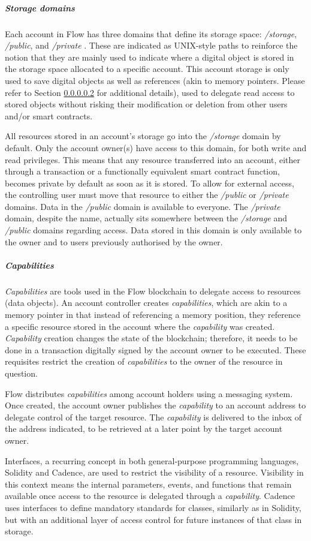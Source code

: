 \documentclass[./4_GeneralApproach.tex]{subfiles}
\begin{document}
    \subparagraph{Storage domains}
    \label{storage_domains}
    Each account in Flow has three domains that define its storage space: \textit{/storage}, \textit{/public}, and \textit{/private} \cite{flow2024}. These are indicated as UNIX-style paths to reinforce the notion that they are mainly used to indicate where a digital object is stored in the storage space allocated to a specific account. This account storage is only used to save digital objects as well as references (akin to memory pointers. Please refer to Section \ref{capabilities_references} for additional details), used to delegate read access to stored objects without risking their modification or deletion from other users and/or smart contracts.
    \par
    All resources stored in an account's storage go into the \textit{/storage} domain by default. Only the account owner(s) have access to this domain, for both write and read privileges. This means that any resource transferred into an account, either through a transaction or a functionally equivalent smart contract function, becomes private by default as soon as it is stored. To allow for external access, the controlling user must move that resource to either the \textit{/public} or \textit{/private} domains. Data in the \textit{/public} domain is available to everyone. The \textit{/private} domain, despite the name, actually sits somewhere between the \textit{/storage} and \textit{/public} domains regarding access. Data stored in this domain is only available to the owner and to users previously authorised by the owner.            

    \subparagraph{Capabilities}
    \label{capabilities_references}
    \textit{Capabilities} are tools used in the Flow blockchain to delegate access to resources (data objects). An account controller creates \textit{capabilities}, which are akin to a memory pointer in that instead of referencing a memory position, they reference a specific resource stored in the account where the \textit{capability} was created. \textit{Capability} creation changes the state of the blockchain; therefore, it needs to be done in a transaction digitally signed by the account owner to be executed. These requisites restrict the creation of \textit{capabilities} to the owner of the resource in question.
    \par
    Flow distributes \textit{capabilities} among account holders using a messaging system. Once created, the account owner publishes the \textit{capability} to an account address to delegate control of the target resource. The \textit{capability} is delivered to the inbox of the address indicated, to be retrieved at a later point by the target account owner.
    \par
    Interfaces, a recurring concept in both general-purpose programming languages, Solidity and Cadence, are used to restrict the visibility of a resource. Visibility in this context means the internal parameters, events, and functions that remain available once access to the resource is delegated through a \textit{capability}. Cadence uses interfaces to define mandatory standards for classes, similarly as in Solidity, but with an additional layer of access control for future instances of that class in storage.
\end{document}
